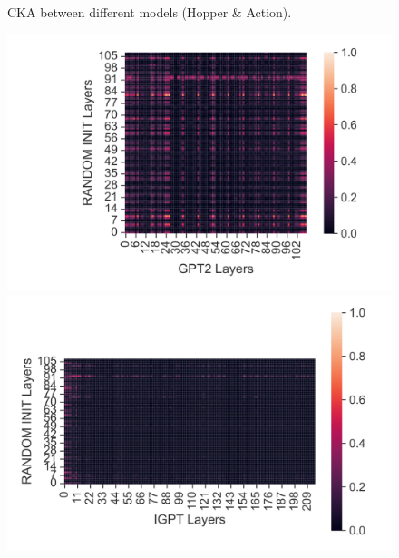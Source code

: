 \documentclass{article}
\begin{document}
\begin{figure}[H]
\begin{minipage}[b]{0.32\linewidth}
    \end{minipage}
    \caption{CKA between different models (Hopper \& Action).}
\end{figure}

\begin{figure}[H]
    \centering
    \begin{minipage}[b]{0.32\linewidth}
        \includegraphics[width=\linewidth]{figs/cka_40_40_dtgpt2_halfcheetah_medium_666_state.png}
    \end{minipage}
    \begin{minipage}[b]{0.32\linewidth}
        \includegraphics[width=\linewidth]{figs/cka_40_40_dtigpt_halfcheetah_medium_666_state.png}
    \end{minipage}
    \begin{minipage}[b]{0.32\linewidth}

\end{minipage}
\end{figure}
\end{document}
